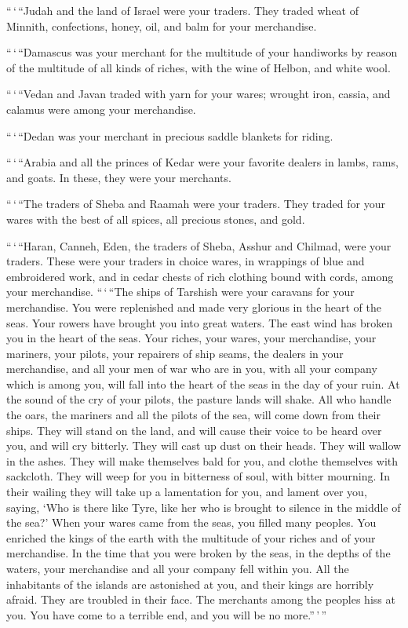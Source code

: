  ``\,`\,``Judah and the land of Israel were your traders.
They traded wheat of Minnith, confections, honey, oil, and balm for your
merchandise.

 ``\,`\,``Damascus was your merchant for the multitude of
your handiworks by reason of the multitude of all kinds of riches, with
the wine of Helbon, and white wool.

 ``\,`\,``Vedan and Javan traded with yarn for your
wares; wrought iron, cassia, and calamus were among your merchandise.

 ``\,`\,``Dedan was your merchant in precious saddle
blankets for riding.

 ``\,`\,``Arabia and all the princes of Kedar were your
favorite dealers in lambs, rams, and goats. In these, they were your
merchants.

 ``\,`\,``The traders of Sheba and Raamah were your
traders. They traded for your wares with the best of all spices, all
precious stones, and gold.

 ``\,`\,``Haran, Canneh, Eden, the traders of Sheba,
Asshur and Chilmad, were your traders.  These were your
traders in choice wares, in wrappings of blue and embroidered work, and
in cedar chests of rich clothing bound with cords, among your
merchandise.  ``\,`\,``The ships of Tarshish were your
caravans for your merchandise. You were replenished and made very
glorious in the heart of the seas.  Your rowers have
brought you into great waters. The east wind has broken you in the heart
of the seas.  Your riches, your wares, your merchandise,
your mariners, your pilots, your repairers of ship seams, the dealers in
your merchandise, and all your men of war who are in you, with all your
company which is among you, will fall into the heart of the seas in the
day of your ruin.  At the sound of the cry of your
pilots, the pasture lands will shake.  All who handle the
oars, the mariners and all the pilots of the sea, will come down from
their ships. They will stand on the land,  and will cause
their voice to be heard over you, and will cry bitterly. They will cast
up dust on their heads. They will wallow in the ashes. 
They will make themselves bald for you, and clothe themselves with
sackcloth. They will weep for you in bitterness of soul, with bitter
mourning.  In their wailing they will take up a
lamentation for you, and lament over you, saying, `Who is there like
Tyre, like her who is brought to silence in the middle of the sea?'
 When your wares came from the seas, you filled many
peoples. You enriched the kings of the earth with the multitude of your
riches and of your merchandise.  In the time that you
were broken by the seas, in the depths of the waters, your merchandise
and all your company fell within you.  All the
inhabitants of the islands are astonished at you, and their kings are
horribly afraid. They are troubled in their face.  The
merchants among the peoples hiss at you. You have come to a terrible
end, and you will be no more.''\,'\,''

